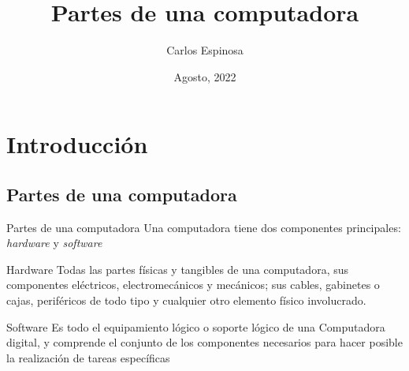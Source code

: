 \documentclass[11pt]{beamer}
\author{Carlos Espinosa}
\title{Partes de una computadora}
\institute{Facultad de Ciencias \\ Universidad Nacional Autónoma de México}
\date{Agosto, 2022}
\begin{document}
\begin{frame}
\titlepage
\end{frame}

\begin{frame}
	\tableofcontents
\end{frame}

\section{Introducción}
	\subsection{Partes de una computadora}
		\begin{frame}{Partes de una computadora}
			Una computadora tiene dos componentes principales: \textit{hardware} y \textit{software}
			\begin{block}{Hardware}
				Todas las partes físicas y tangibles de una computadora, sus componentes eléctricos, electromecánicos y mecánicos; sus cables, gabinetes o cajas, periféricos de todo tipo y cualquier otro elemento físico involucrado.
			\end{block}
			\begin{block}{Software}
				Es todo el equipamiento lógico o soporte lógico de una Computadora digital, y comprende el conjunto de los componentes necesarios para hacer posible la realización de tareas específicas
			\end{block}
		\end{frame}
\end{document}
